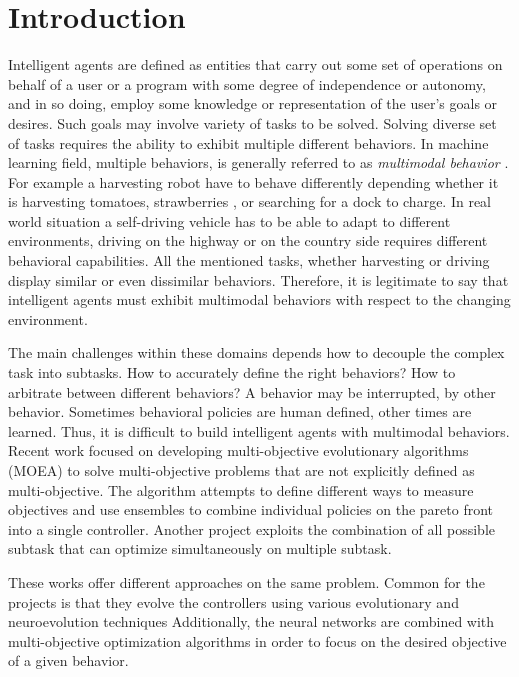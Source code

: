 \documentclass[format=acmsmall, review=false, screen=true]{acmart}
\begin{document}
\section{Introduction}

Intelligent agents are defined as entities that carry out some set of operations on behalf of a user or a program with some degree of independence or autonomy, and in so doing, employ some knowledge or representation of the user's goals or desires. Such goals may involve variety of tasks to be solved. Solving diverse set of tasks requires the ability to exhibit multiple different behaviors. In machine learning field, multiple behaviors, is generally referred to as \emph{multimodal behavior} \cite{li:alife4}. For example a harvesting robot have to behave differently depending whether it is harvesting tomatoes, strawberries \cite{dogtech}, or searching for a dock to charge. In real world situation a self-driving vehicle has to be able to adapt to different environments, driving on the highway or on the country side requires different behavioral capabilities. All the mentioned tasks, whether harvesting or driving display similar or even dissimilar behaviors. Therefore, it is legitimate to say that intelligent agents must exhibit multimodal behaviors with respect to the changing environment.

The main challenges within these domains depends how to decouple the complex task into subtasks. How to accurately define the right behaviors? How to arbitrate between different behaviors? A behavior may be interrupted, by other behavior. Sometimes behavioral policies are human defined, other times are learned. Thus, it is difficult to build intelligent agents with multimodal behaviors. Recent work focused on developing multi-objective evolutionary algorithms (MOEA) \cite{tonder2013multi} to solve multi-objective problems that are not explicitly defined as multi-objective. The algorithm attempts to define different ways to measure objectives and use ensembles to combine individual policies on the pareto front into a single controller. Another project\cite{Huizinga2018EvolvingMR} exploits the combination of all possible subtask that can optimize simultaneously on multiple subtask. 

These works offer different approaches on the same problem. Common for the projects is that they evolve the controllers using various evolutionary and neuroevolution techniques Additionally, the neural networks are combined with multi-objective optimization algorithms in order to focus on the desired objective of a given behavior.
\end{document}
